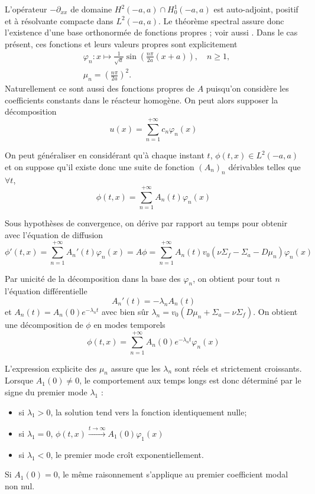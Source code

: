 \documentclass{article}
\begin{document}
L'opérateur $-\partial_{xx}$ de domaine $H^2(-a,a)\cap H_0^1(-a,a)$ est auto-adjoint, positif et à résolvante compacte dans $L^2(-a,a)$. Le théorème spectral assure donc l'existence d'une base orthonormée de fonctions propres \cite[chap.~6, section~6.3]{Allaire2018}; voir aussi \textcite{Brezis2011}. Dans le cas présent, ces fonctions et leurs valeurs propres sont explicitement
\begin{align*}
    &\varphi_n:x\mapsto \frac{1}{\sqrt{a}}\sin\left(\frac{n\pi}{2a}(x+a)\right), \quad n\geq1,\\
    &\mu_n = \left(\frac{n\pi}{2a}\right)^2.
\end{align*}
Naturellement ce sont aussi des fonctions propres de $A$ puisqu'on considère les coefficients constants dans le réacteur homogène. On peut alors supposer la décomposition  
\begin{equation}
    u(x) = \sum_{n=1}^{+\infty}c_n\varphi_n(x)
\end{equation}

On peut généraliser en considérant qu'à chaque instant $t$, $\phi(t,x) \in L^2(-a,a)$ et on suppose qu'il existe donc une suite de fonction $(A_n)_n$ dérivables telles que $\forall t$, 
\begin{equation}
    \phi(t,x) = \sum_{n=1}^{+\infty}A_n(t)\varphi_n(x)
\end{equation}

Sous hypothèses de convergence, on dérive par rapport au temps pour obtenir avec l'équation de diffusion 
\begin{equation*}
    \phi'(t,x) = \sum_{n=1}^{+\infty}A_n'(t)\varphi_n(x) = A\phi = \sum_{n=1}^{+\infty}A_n(t)v_0(\nu\Sigma_f-\Sigma_a - D\mu_n)\varphi_n(x)
\end{equation*}

Par unicité de la décomposition dans la base des $\varphi_n$, on obtient pour tout $n$ l'équation différentielle
\[
A_n'(t) = -\lambda_nA_n(t)
\]
et $A_n(t)= A_n(0)e^{-\lambda_nt}$ avec bien sûr $\lambda_n = v_0(D\mu_n +\Sigma_a -\nu\Sigma_f)$. On obtient une décomposition de $\phi$ en modes temporels 
\begin{equation}
    \phi(t,x) = \sum_{n=1}^{+\infty}A_n(0)e^{-\lambda_nt}\varphi_n(x) 
\end{equation}

L'expression explicite des $\mu_n$ assure que les $\lambda_n$ sont réels et strictement croissants. Lorsque $A_1(0)\neq0$, le comportement aux temps longs est donc déterminé par le signe du premier mode $\lambda_1$ :
\begin{itemize}
    \item si $\lambda_1>0$, la solution tend vers la fonction identiquement nulle;
    \item si $\lambda_1 =0$, $\phi(t,x) \xrightarrow{t \to \infty} A_1(0)\varphi_1(x)$
    \item si $\lambda_1 <0$, le premier mode croît exponentiellement.
\end{itemize}
Si $A_1(0)=0$, le même raisonnement s'applique au premier coefficient modal non nul.
\end{document}

